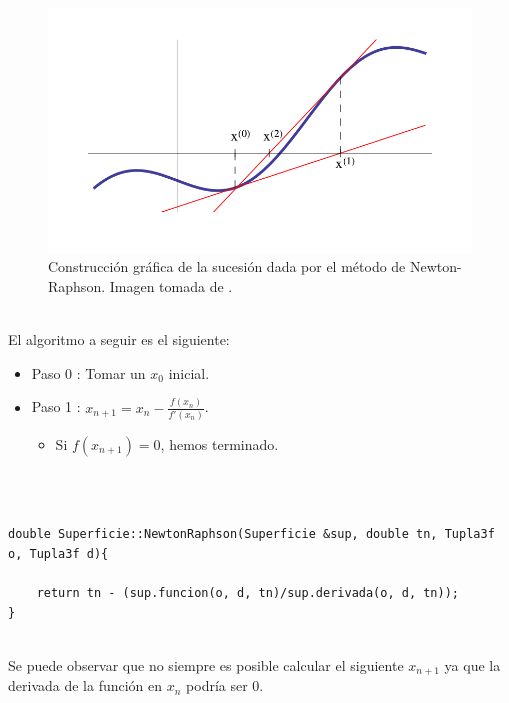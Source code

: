 \begin{figure}[h]
	\begin{center}
		\includegraphics[width=1.0\textwidth]{imagenes/newton.png}
	\end{center}
	\caption{Construcción gráfica de la sucesión dada por el método de Newton-Raphson. Imagen tomada de \cite{CarmenS}.}
	\label{fig:etiq_7}
\end{figure}
${ }$\\

El algoritmo a seguir es el siguiente:

\begin{itemize}
	\item Paso 0 : Tomar un $x_0$ inicial.
	\item Paso 1 : $x_{n+1} = x_n - \frac{f(x_n)}{f'(x_n)}$.
	\begin{itemize}
		\item Si $f(x_{n+1}) = 0$, hemos terminado.
	\end{itemize}
\end{itemize}
${ }$\\

\begin{lstlisting}[style=Consola]

double Superficie::NewtonRaphson(Superficie &sup, double tn, Tupla3f o, Tupla3f d){

	return tn - (sup.funcion(o, d, tn)/sup.derivada(o, d, tn));
}

\end{lstlisting}
${ }$\\



Se puede observar que no siempre es posible calcular el siguiente $x_{n+1}$ ya que la derivada de la función en $x_{n}$ podría ser $0$.
${ }$\\
${ }$\\


